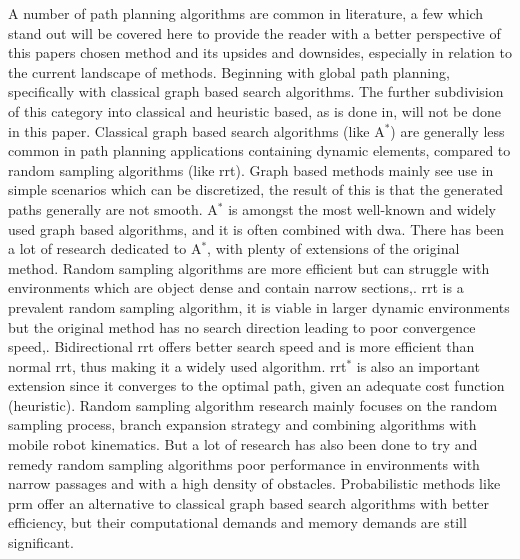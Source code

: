 A number of path planning algorithms are common in literature, a few which stand out will be covered here to provide the reader with a better perspective of this papers chosen method and its upsides and downsides, especially in relation to the current landscape of methods.
Beginning with global path planning, specifically with classical graph based search algorithms. The further subdivision of this category into classical and heuristic based, as is done in\:\cite{katona_obstacle_2024}, will not be done in this paper.
Classical graph based search algorithms (like A$^*$) are generally less common in path planning applications containing dynamic elements, compared to random sampling algorithms (like \ac{rrt})\:\cite{cai_mobile_2021}.
Graph based methods mainly see use in simple scenarios which can be discretized, the result of this is that the generated paths generally are not smooth\:\cite{reda_path_2024}. A$^*$ is amongst the most well-known and widely used graph based algorithms, and it is often combined with \ac{dwa}\:\cite{reda_path_2024}. There has been a lot of research dedicated to A$^*$, with plenty of extensions of the original method\:\cite{reda_path_2024}.
Random sampling algorithms are more efficient but can struggle with environments which are object dense and contain narrow sections\:\cite{cai_mobile_2021},\cite{liu_path_2023}. 
\ac{rrt} is a prevalent random sampling algorithm, it is viable in larger dynamic environments but the original method has no search direction leading to poor convergence speed\:\cite{reda_path_2024},\cite{katona_obstacle_2024}.
Bidirectional \ac{rrt} offers better search speed and is more efficient than normal \ac{rrt}, thus making it a widely used algorithm\:\cite{gao_research_2021}. \ac{rrt}$^*$ is also an important extension since it converges to the optimal path, given an adequate cost function (heuristic)\:\cite{katona_obstacle_2024}.
Random sampling algorithm research mainly focuses on the random sampling process, branch expansion strategy and combining algorithms with mobile robot kinematics\:\cite{liu_path_2023}. But a lot of research has also been done to try and remedy random sampling algorithms poor performance in environments with narrow passages and with a high density of obstacles\:\cite{liu_path_2023}.
Probabilistic methods like \ac{prm} offer an alternative to classical graph based search algorithms with better efficiency, but their computational demands and memory demands are still significant\:\cite{katona_obstacle_2024}. 

